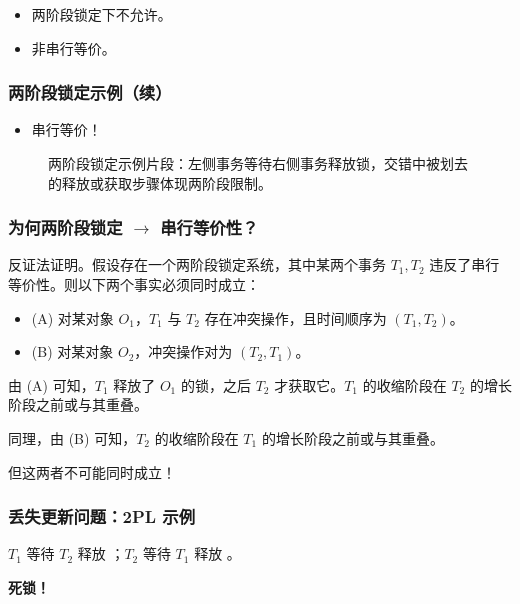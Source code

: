 \begin{itemize}
  \item 两阶段锁定下不允许。
  \item 非串行等价。
\end{itemize}

\subsubsection{两阶段锁定示例（续）}

\begin{itemize}
  \item 串行等价！
\end{itemize}

\begin{figure}[H]
  \centering
  \caption{两阶段锁定示例片段：左侧事务等待右侧事务释放锁，交错中被划去的释放或获取步骤体现两阶段限制。}
\end{figure}

\subsubsection{为何两阶段锁定 \texorpdfstring{$\rightarrow$}{→} 串行等价性？}

反证法证明。假设存在一个两阶段锁定系统，其中某两个事务 $T_1,T_2$ 违反了串行等价性。则以下两个事实必须同时成立：

\begin{itemize}
  \item (A) 对某对象 $O_1$，$T_1$ 与 $T_2$ 存在冲突操作，且时间顺序为 $(T_1,T_2)$。
  \item (B) 对某对象 $O_2$，冲突操作对为 $(T_2,T_1)$。
\end{itemize}

由 (A) 可知，$T_1$ 释放了 $O_1$ 的锁，之后 $T_2$ 才获取它。$T_1$ 的收缩阶段在 $T_2$ 的增长阶段之前或与其重叠。

同理，由 (B) 可知，$T_2$ 的收缩阶段在 $T_1$ 的增长阶段之前或与其重叠。

但这两者不可能同时成立！

\subsubsection{丢失更新问题：2PL 示例}

$T_1$ 等待 $T_2$ 释放 ；$T_2$ 等待 $T_1$ 释放 。

\textbf{死锁！}

